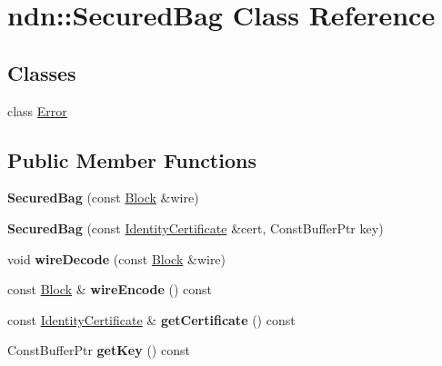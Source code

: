 \hypertarget{classndn_1_1SecuredBag}{}\section{ndn\+:\+:Secured\+Bag Class Reference}
\label{classndn_1_1SecuredBag}
\subsection*{Classes}
\begin{DoxyCompactItemize}
\item 
class \hyperlink{classndn_1_1SecuredBag_1_1Error}{Error}
\end{DoxyCompactItemize}
\subsection*{Public Member Functions}
\begin{DoxyCompactItemize}
\item 
{\bfseries Secured\+Bag} (const \hyperlink{classndn_1_1Block}{Block} \&wire)\hypertarget{classndn_1_1SecuredBag_a1a03bd2e9427abe254ccffd1e5b1fc8e}{}\label{classndn_1_1SecuredBag_a1a03bd2e9427abe254ccffd1e5b1fc8e}

\item 
{\bfseries Secured\+Bag} (const \hyperlink{classndn_1_1IdentityCertificate}{Identity\+Certificate} \&cert, Const\+Buffer\+Ptr key)\hypertarget{classndn_1_1SecuredBag_ae24aa18a1fff00def243d2101a41517e}{}\label{classndn_1_1SecuredBag_ae24aa18a1fff00def243d2101a41517e}

\item 
void {\bfseries wire\+Decode} (const \hyperlink{classndn_1_1Block}{Block} \&wire)\hypertarget{classndn_1_1SecuredBag_ab507a7b1b11c2d8560f0340f371962e7}{}\label{classndn_1_1SecuredBag_ab507a7b1b11c2d8560f0340f371962e7}

\item 
const \hyperlink{classndn_1_1Block}{Block} \& {\bfseries wire\+Encode} () const\hypertarget{classndn_1_1SecuredBag_a3aed92c55859e2309aede79f88836e54}{}\label{classndn_1_1SecuredBag_a3aed92c55859e2309aede79f88836e54}

\item 
const \hyperlink{classndn_1_1IdentityCertificate}{Identity\+Certificate} \& {\bfseries get\+Certificate} () const\hypertarget{classndn_1_1SecuredBag_abc0ce64afdc7fd97259d1c06102ad44e}{}\label{classndn_1_1SecuredBag_abc0ce64afdc7fd97259d1c06102ad44e}

\item 
Const\+Buffer\+Ptr {\bfseries get\+Key} () const\hypertarget{classndn_1_1SecuredBag_a40db1f4ae731b519b039ec47bc188b3d}{}\label{classndn_1_1SecuredBag_a40db1f4ae731b519b039ec47bc188b3d}

\end{DoxyCompactItemize}


